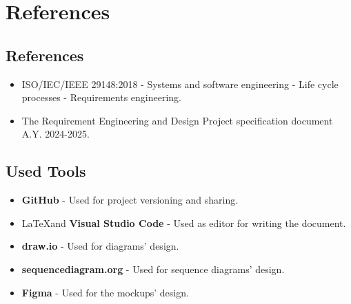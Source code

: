 \chapter{References}
\label{ch:references}

\section{References}
\label{sec:references}

\begin{itemize}
	\item ISO/IEC/IEEE 29148:2018 - Systems and software engineering - Life cycle processes - Requirements engineering.
	\item The Requirement Engineering and Design Project specification document A.Y. 2024-2025.
\end{itemize}

\section{Used Tools}
\label{sec:used-tools}

\begin{itemize}
	\item \textbf{GitHub} - Used for project versioning and sharing.
	\item \LaTeX \space and \textbf{Visual Studio Code} - Used as editor for writing the document.
	\item \textbf{draw.io} - Used for diagrams' design.
	\item \textbf{sequencediagram.org} - Used for sequence diagrams' design.
	\item \textbf{Figma} - Used for the mockups' design.
\end{itemize}

